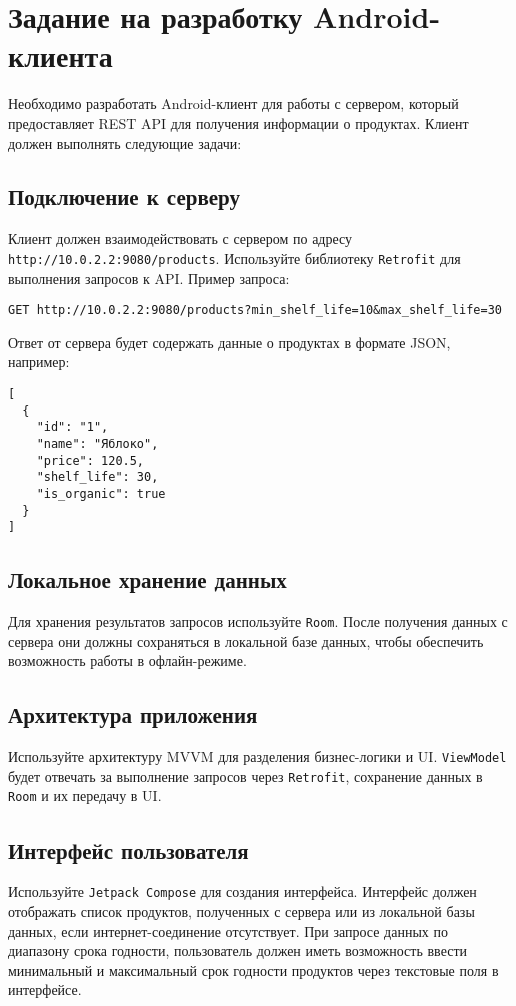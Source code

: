 \section{Задание на разработку Android-клиента}

Необходимо разработать Android-клиент для работы с сервером, который предоставляет REST API для получения информации о продуктах. Клиент должен выполнять следующие задачи:

\subsection{Подключение к серверу}
Клиент должен взаимодействовать с сервером по адресу \texttt{http://10.0.2.2:9080/products}. Используйте библиотеку \texttt{Retrofit} для выполнения запросов к API. Пример запроса:

\begin{verbatim}
GET http://10.0.2.2:9080/products?min_shelf_life=10&max_shelf_life=30
\end{verbatim}

Ответ от сервера будет содержать данные о продуктах в формате JSON, например:

\begin{verbatim}
[
  {
    "id": "1",
    "name": "Яблоко",
    "price": 120.5,
    "shelf_life": 30,
    "is_organic": true
  }
]
\end{verbatim}

\subsection{Локальное хранение данных}
Для хранения результатов запросов используйте \texttt{Room}. После получения данных с сервера они должны сохраняться в локальной базе данных, чтобы обеспечить возможность работы в офлайн-режиме.

\subsection{Архитектура приложения}
Используйте архитектуру MVVM для разделения бизнес-логики и UI. \texttt{ViewModel} будет отвечать за выполнение запросов через \texttt{Retrofit}, сохранение данных в \texttt{Room} и их передачу в UI.

\subsection{Интерфейс пользователя}
Используйте \texttt{Jetpack Compose} для создания интерфейса. Интерфейс должен отображать список продуктов, полученных с сервера или из локальной базы данных, если интернет-соединение отсутствует. При запросе данных по диапазону срока годности, пользователь должен иметь возможность ввести минимальный и максимальный срок годности продуктов через текстовые поля в интерфейсе.

